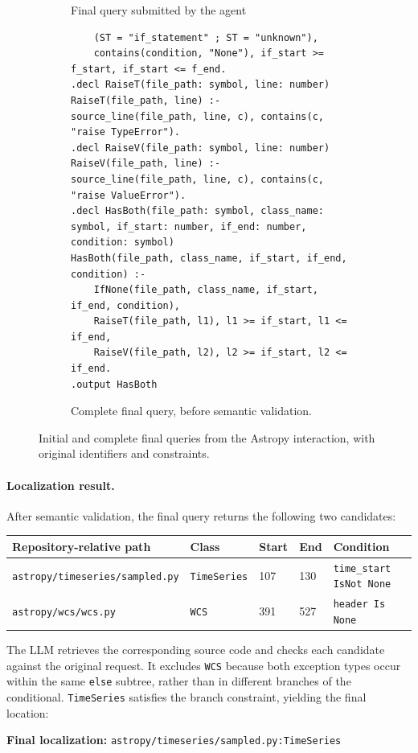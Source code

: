 \begin{landscape}
\begin{figure}[p]
\begin{subfigure}[t]{\linewidth}
\begin{stepbox}[datalocstep]{Final query submitted by the agent}
\begin{verbatim}
    (ST = "if_statement" ; ST = "unknown"),
    contains(condition, "None"), if_start >= f_start, if_start <= f_end.
.decl RaiseT(file_path: symbol, line: number)
RaiseT(file_path, line) :- source_line(file_path, line, c), contains(c, "raise TypeError").
.decl RaiseV(file_path: symbol, line: number)
RaiseV(file_path, line) :- source_line(file_path, line, c), contains(c, "raise ValueError").
.decl HasBoth(file_path: symbol, class_name: symbol, if_start: number, if_end: number, condition: symbol)
HasBoth(file_path, class_name, if_start, if_end, condition) :-
    IfNone(file_path, class_name, if_start, if_end, condition),
    RaiseT(file_path, l1), l1 >= if_start, l1 <= if_end,
    RaiseV(file_path, l2), l2 >= if_start, l2 <= if_end.
.output HasBoth
\end{verbatim}
\end{stepbox}
\caption{Complete final query, before semantic validation.}
\label{fig:dataloc-query-repaired}
\end{subfigure}
\caption{Initial and complete final queries from the Astropy interaction, with original identifiers and constraints.}
\label{fig:dataloc-query-repair}
\end{figure}
\end{landscape}

\paragraph*{Localization result.}
After semantic validation, the final query returns the following two candidates:
\begin{center}
\footnotesize
{}
\setlength{\tabcolsep}{4pt}
\begin{tabular}{@{}lllll@{}}
\toprule
Repository-relative path & Class & Start & End & Condition \\
\midrule
\texttt{astropy/timeseries/sampled.py} & \texttt{TimeSeries} & 107 & 130 & \texttt{time\_start IsNot None} \\
\texttt{astropy/wcs/wcs.py} & \texttt{WCS} & 391 & 527 & \texttt{header Is None} \\
\bottomrule
\end{tabular}
\end{center}
The LLM retrieves the corresponding source code and checks each candidate against the original request. It excludes \texttt{WCS} because both exception types occur within the same \texttt{else} subtree, rather than in different branches of the conditional. \texttt{TimeSeries} satisfies the branch constraint, yielding the final location:\par\smallskip
\noindent\textbf{Final localization:} \texttt{astropy/timeseries/sampled.py:TimeSeries}
\endgroup
